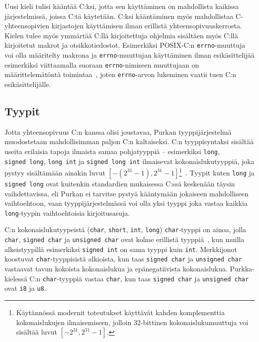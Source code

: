 Uusi kieli tulisi kääntää C:ksi, jotta sen käyttäminen on mahdollista kaikissa
järjestelmissä, joissa C:tä käytetään. C:ksi kääntäminen myös mahdollistaa
C-yhteensopivien kirjastojen käyttämisen ilman erillistä
yhteensopivuuskerrosta. Kielen tulee myös ymmärtää C:llä kirjoitettuja ohjelmia
sisältäen myös C:llä kirjoitetut makrot ja otsikkotiedostot. Esimerkiksi
POSIX-C:n \texttt{errno}-muuttuja voi olla määritelty makrona ja
\texttt{errno}-muuttujan käyttäminen ilman esikäsittelijää esimerkiksi
viittaamalla suoraan \texttt{errno}-nimiseen muuttujaan on määrittelemätöntä
toimintaa~\citep[s. 234]{POSIX}, joten \texttt{errno}-arvon lukeminen vaatii
tuen C:n esikäsittelijälle.

\subsection{Tyypit}

Jotta yhteensopivuus C:n kanssa olisi joustavaa, Purkan tyyppijärjestelmä
muodostetaan mahdollisimman paljon C:n kaltaiseksi. C:n tyyppisyntaksi sisältää
useita erilaisia tapoja ilmaista samaa pohjatyyppiä -- esimerkiksi
\texttt{long}, \texttt{signed~long}, \texttt{long~int} ja
\texttt{signed~long~int} ilmaisevat kokonaislukutyyppiä, joka pystyy
sisältämään ainakin luvut $[-(2^{31} - 1), 2^{31}-1]$\footnote{Käytännössä
modernit toteutukset käyttävät kahden komplementtia kokonaislukujen
ilmaisemiseen, jolloin 32-bittinen kokonaislukumuuttuja voi sisältää luvut
$[-2^{31}, 2^{31} - 1]$.}~\citep{C18}. Tyypit kuten \texttt{long} ja
\texttt{signed long} ovat kuitenkin standardien mukaisessa C:ssä keskenään
täysin vaihdettavissa, eli Purkan ei tarvitse pystyä kääntymään jokaiseen
mahdolliseen vaihtoehtoon, vaan tyyppijärjestelmässä voi olla yksi tyyppi joka
vastaa kaikkia \texttt{long}-tyypin vaihtoehtoisia kirjoitusasuja.

C:n kokonaislukutyypeistä (\texttt{char}, \texttt{short}, \texttt{int},
\texttt{long}) \texttt{char}-tyyppi on ainoa, jolla \texttt{char},
\texttt{signed char} ja \texttt{unsigned char} ovat kolme erillistä
tyyppiä~\citep{C18}, kun muilla alkeistyypillä esimerkiksi \texttt{signed int}
on sama tyyppi kuin \texttt{int}. Merkkijonot koostuvat
\texttt{char}-tyyppisistä alkioista, kun taas \texttt{signed char} ja
\texttt{unsigned char} vastaavat tavun kokoista kokonaislukua ja
epänegatiivista kokonaislukua. Purkka-kielessä C:n \texttt{char}-tyyppiä
vastaa \texttt{char}, kun taas \texttt{signed char} ja \texttt{unsigned char}
ovat \texttt{i8} ja \texttt{u8}.

